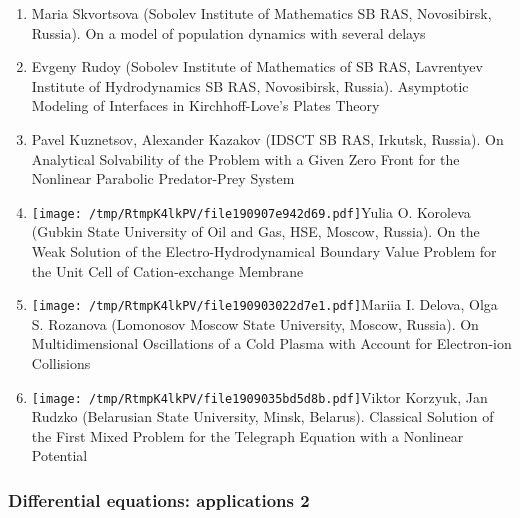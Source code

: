 \documentclass[
]{article}
\providecommand{\tightlist}{%
  \setlength{\itemsep}{0pt}\setlength{\parskip}{0pt}}
\begin{document}
\begin{enumerate}
\def\labelenumi{\arabic{enumi}.}
\tightlist
\item
  Maria Skvortsova (Sobolev Institute of Mathematics SB RAS,
  Novosibirsk, Russia). On a model of population dynamics with several
  delays
\item
  Evgeny Rudoy (Sobolev Institute of Mathematics of SB RAS, Lavrentyev
  Institute of Hydrodynamics SB RAS, Novosibirsk, Russia). Asymptotic
  Modeling of Interfaces in Kirchhoff-Love's Plates Theory
\item
  Pavel Kuznetsov, Alexander Kazakov (IDSCT SB RAS, Irkutsk, Russia). On
  Analytical Solvability of the Problem with a Given Zero Front for the
  Nonlinear Parabolic Predator-Prey System
\item
  \protect\texttt{[image: /tmp/RtmpK4lkPV/file190907e942d69.pdf]}Yulia
  O. Koroleva (Gubkin State University of Oil and Gas, HSE, Moscow,
  Russia). On the Weak Solution of the Electro-Hydrodynamical Boundary
  Value Problem for the Unit Cell of Cation-exchange Membrane
\item
  \protect\texttt{[image: /tmp/RtmpK4lkPV/file190903022d7e1.pdf]}Mariia
  I. Delova, Olga S. Rozanova (Lomonosov Moscow State University,
  Moscow, Russia). On Multidimensional Oscillations of a Cold Plasma
  with Account for Electron-ion Collisions
\item
  \protect\texttt{[image: /tmp/RtmpK4lkPV/file1909035bd5d8b.pdf]}Viktor
  Korzyuk, Jan Rudzko (Belarusian State University, Minsk, Belarus).
  Classical Solution of the First Mixed Problem for the Telegraph
  Equation with a Nonlinear Potential
\end{enumerate}

\hypertarget{dea2}{%
\subsubsection{Differential equations: applications 2}\label{dea2}}
\end{document}

